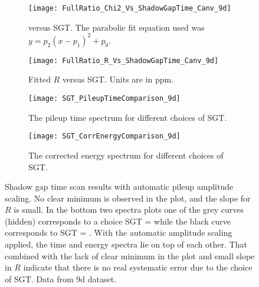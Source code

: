 \begin{figure}[]
\centering
    \begin{subfigure}[]{0.45\textwidth}
        \centering
        \texttt{[image: FullRatio\_Chi2\_Vs\_ShadowGapTime\_Canv\_9d]}
        \caption{\chisq versus SGT. The parabolic fit equation used was $y = p_{2}(x - p_{1})^{2} + p_{0}.$}
    \end{subfigure}%
    \hspace{1cm}
    \begin{subfigure}[]{0.45\textwidth}
        \centering
        \texttt{[image: FullRatio\_R\_Vs\_ShadowGapTime\_Canv\_9d]}
        \caption{Fitted $R$ versus SGT. Units are in ppm.}
    \end{subfigure}

    \begin{subfigure}[]{0.45\textwidth}
        \centering
        \texttt{[image: SGT\_PileupTimeComparison\_9d]}
        \caption{The pileup time spectrum for different choices of SGT.}
    \end{subfigure}%
    \hspace{1cm}
    \begin{subfigure}[]{0.45\textwidth}
        \centering
        \texttt{[image: SGT\_CorrEnergyComparison\_9d]}
        \caption{The corrected energy spectrum for different choices of SGT.}
    \end{subfigure}
\caption[Pileup shadow gap time scan with automatic pileup amplitude scaling]{Shadow gap time scan results with automatic pileup amplitude scaling. No clear minimum is observed in the \chisq plot, and the slope for $R$ is small. In the bottom two spectra plots one of the grey curves (hidden) corresponds to a choice SGT =  while the black curve corresponds to SGT = . With the automatic amplitude scaling applied, the time and energy spectra lie on top of each other. That combined with the lack of clear minimum in the \chisq plot and small slope in $R$ indicate that there is no real systematic error due to the choice of SGT. Data from 9d dataset.}
\label{fig:SGTscan}
\end{figure}



